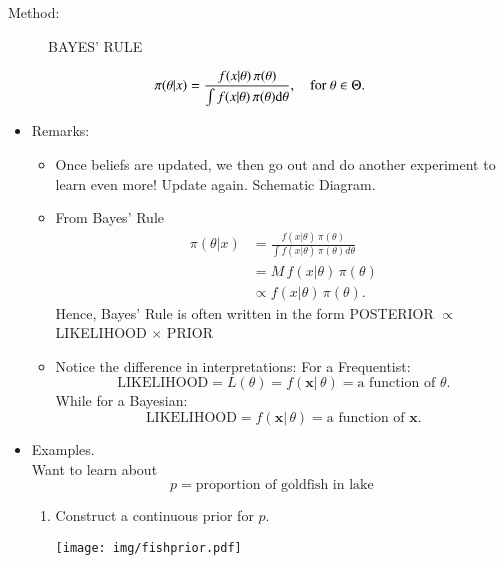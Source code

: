 \documentclass[captions=tableheading]{scrbook}
\begin{document}
\begin{description}
\item[Method:] BAYES' RULE
\end{description}

\[
\pi(\theta|x)=\frac{f(x|\theta)\, \pi(\theta)}{\int f(x|\theta)\, \pi(\theta)
\mathrm{d}\theta}, \quad \mbox{for $\theta \in \Theta$.}
\]
\begin{itemize}

\item Remarks:\\
\label{sec-1_3_1_1}%
\begin{itemize}
\item Once beliefs are updated, we then go out and do another experiment to learn even more!  Update again.  Schematic Diagram.
\item From Bayes' Rule
   \begin{align*}
   \pi(\theta|x)&=\frac{f(x|\theta)\, \pi(\theta)}
   {\int f(x|\theta)\, \pi(\theta)d\theta}\\
   &= M \, f(x|\theta)\, \pi(\theta)\\
   &\propto f(x|\theta)\, \pi(\theta).
   \end{align*}
   Hence, Bayes' Rule is often written in the form POSTERIOR $\propto$ LIKELIHOOD $\times$ PRIOR
\item Notice the difference in interpretations:
   For a Frequentist:
   \[
   \mbox{LIKELIHOOD}=L(\theta)=f(\mathbf{x}|\,\theta)= \mbox{a function of $\theta$}.
   \]
   While for a Bayesian:
   \[
   \mbox{LIKELIHOOD}=f(\mathbf{x}|\,\theta)= \mbox{a function of $\mathbf{x}$}.
   \]
\end{itemize}


\item Examples.\\
\label{sec-1_3_1_2}%
Want to learn about
\[
p = \mbox{proportion of goldfish in lake}
\]


\begin{enumerate}
\item Construct a continuous prior for $p$.

   \begin{center}

   \texttt{[image: img/fishprior.pdf]}


\end{center}
\end{enumerate}
\end{itemize}
\end{document}
